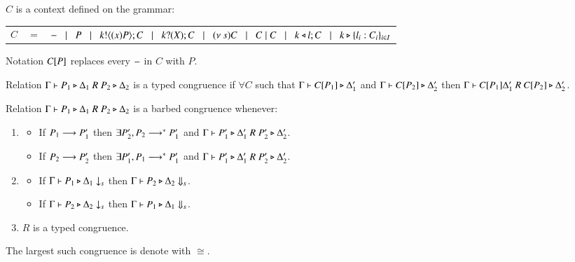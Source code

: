 \begin{definition}[Context]
	$C$ is a context defined on the grammar:

	\begin{tabular}{rcl}
		$C$ &$=$& $- \;\;\;|\;\;\; P \;\;\;|\;\;\; k ! \langle (x)P \rangle ; C \;\;\;|\;\;\; k ? (X) ; C \;\;\;|\;\;\; (\nu\ s) C \;\;\;|\;\;\; C \;|\; C \;\;\;|\;\;\; k \triangleleft l ; C \;\;\;|\;\;\; k \triangleright \{l_i:C_i\}_{i \in I}$
	\end{tabular}
	Notation $C[P]$ replaces every $-$ in $C$ with $P$.
\end{definition}

\begin{definition}
	Relation $\Gamma \vdash P_1 	\triangleright \Delta_1\ R\ P_2 \triangleright \Delta_2$ is a typed congruence if
	$\forall C$ such that $\Gamma \vdash C[P_1] \triangleright \Delta_1'$ and
	$\Gamma \vdash C[P_2] \triangleright \Delta_2'$ then
	$\Gamma \proves \context{C}{P_1} \Delta_1'\ R\ \context{C}{P_2} \hastype \Delta_2'$.
\end{definition}

\begin{definition}
	Relation $\Gamma \vdash P_1 \triangleright \Delta_1\ R\ P_2 \triangleright \Delta_2$ is a barbed congruence
	whenever:
	\begin{enumerate}
		\item
		\begin{itemize}
			\item	If $P_1 \longrightarrow P_1'$ then $\exists P_2', P_2 \longrightarrow^* P_1'$ and $\Gamma \vdash P_1' \triangleright \Delta_1'\ R\ P_2' \triangleright \Delta_2'$.
			\item	If $P_2 \longrightarrow P_2'$ then $\exists P_1', P_1 \longrightarrow^* P_1'$ and $\Gamma \vdash P_1' \triangleright \Delta_1'\ R\ P_2' \triangleright \Delta_2'$.
		\end{itemize}
		\item
		\begin{itemize}
			\item	If $\Gamma \vdash P_1 \triangleright \Delta_1 \downarrow_{s}$ then $\Gamma \vdash P_2 \triangleright \Delta_2 \Downarrow_{s}$.
			\item	If $\Gamma \vdash P_2 \triangleright \Delta_2 \downarrow_{s}$ then $\Gamma \vdash P_1 \triangleright \Delta_1 \Downarrow_{s}$.
		\end{itemize}
		\item	$R$ is a typed congruence.
	\end{enumerate}
	The largest such congruence is denote with $\cong$.
\end{definition}

